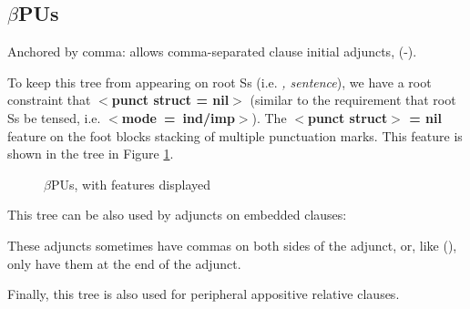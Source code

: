 \subsection{$\beta$PUs}

Anchored by comma: allows comma-separated clause initial adjuncts,
(-).



To keep this tree from appearing on root Ss (i.e. {\it , sentence}),
we have a root constraint that {\bf $<$punct struct = nil$>$} (similar
to the requirement that root Ss be tensed, i.e. {\bf $<$mode~=~ind/imp$>$}).  The {\bf $<$punct struct$>$ = nil} feature on the foot
blocks stacking of multiple punctuation marks. This feature is shown
in the tree in Figure \ref{PUs}.

\begin{figure}[hbt]
\centering
\hspace{0.0in}
\caption{$\beta$PUs, with features displayed}
\label{PUs}
\end{figure}

This tree can be also used by adjuncts on embedded clauses:


These adjuncts sometimes have commas on both sides of the adjunct, or,
like (), only have them at the end of the adjunct.

Finally, this tree is also used for peripheral appositive relative
clauses.



